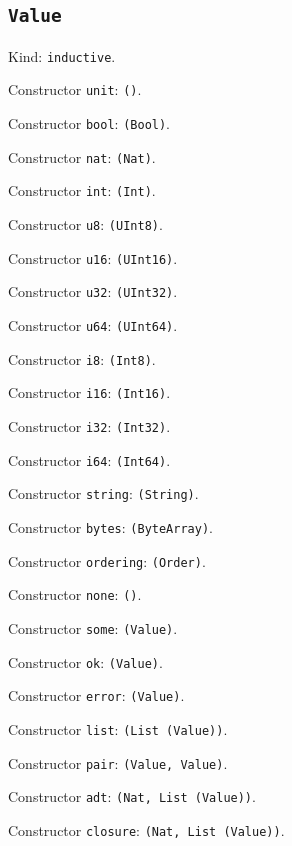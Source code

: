 \documentclass[11pt]{article}
\begin{document}
\subsection*{\texttt{Value}}
\noindent Kind: \texttt{inductive}.\par
\noindent Constructor \texttt{unit}: \texttt{()}.\par
\noindent Constructor \texttt{bool}: \texttt{(Bool)}.\par
\noindent Constructor \texttt{nat}: \texttt{(Nat)}.\par
\noindent Constructor \texttt{int}: \texttt{(Int)}.\par
\noindent Constructor \texttt{u8}: \texttt{(UInt8)}.\par
\noindent Constructor \texttt{u16}: \texttt{(UInt16)}.\par
\noindent Constructor \texttt{u32}: \texttt{(UInt32)}.\par
\noindent Constructor \texttt{u64}: \texttt{(UInt64)}.\par
\noindent Constructor \texttt{i8}: \texttt{(Int8)}.\par
\noindent Constructor \texttt{i16}: \texttt{(Int16)}.\par
\noindent Constructor \texttt{i32}: \texttt{(Int32)}.\par
\noindent Constructor \texttt{i64}: \texttt{(Int64)}.\par
\noindent Constructor \texttt{string}: \texttt{(String)}.\par
\noindent Constructor \texttt{bytes}: \texttt{(ByteArray)}.\par
\noindent Constructor \texttt{ordering}: \texttt{(Order)}.\par
\noindent Constructor \texttt{none}: \texttt{()}.\par
\noindent Constructor \texttt{some}: \texttt{(Value)}.\par
\noindent Constructor \texttt{ok}: \texttt{(Value)}.\par
\noindent Constructor \texttt{error}: \texttt{(Value)}.\par
\noindent Constructor \texttt{list}: \texttt{(List (Value))}.\par
\noindent Constructor \texttt{pair}: \texttt{(Value, Value)}.\par
\noindent Constructor \texttt{adt}: \texttt{(Nat, List (Value))}.\par
\noindent Constructor \texttt{closure}: \texttt{(Nat, List (Value))}.\par
\end{document}
